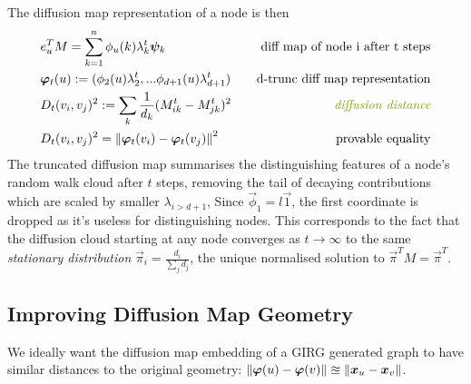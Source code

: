 The diffusion map representation of a node is then
\begin{align*}
  & e_u^T M = \sum_{k=1}^n \phi_u(k) \lambda_k^t \vec{\psi}_k \quad & \text{diff map of node i after t steps}\\
  & \vec{\varphi}_t(u) := (\phi_2(u) \lambda_2^t,... \phi_{d+1}(u) \lambda_{d+1}^t) 
  \quad & \text{d-trunc diff map representation}
  \\
  & D_t(v_i, v_j)^2 := \sum_k \frac{1}{d_k} (M^t_{ik} - M^t_{jk})^2
  \quad & \text{\textit{diffusion distance}}
  \\
  & D_t(v_i, v_j)^2 = \norm{\vec{\varphi}_t(v_i) - \vec{\varphi}_t(v_j)}^2
  \quad & \text{provable equality}
\end{align*}
%
The truncated diffusion map summarises the distinguishing features of a node's random walk cloud after $t$ steps, removing the tail of decaying contributions which are scaled by smaller $\lambda_{i > d+1}$,
Since $\vec{\phi}_1 = l \vec{1}$, the first coordinate is dropped as it's useless for distinguishing nodes. This corresponds to the fact that the diffusion cloud starting at any node converges as $t \to \infty$ to the same \textit{stationary distribution} $\vec{\pi}_i = \frac{d_i}{\sum_j d_j}$, the unique normalised solution to $\vec{\pi}^T M = \vec{\pi}^T$.

\subsection{Improving Diffusion Map Geometry}
\label{sec:diff_map_geometry}
We ideally want the diffusion map embedding of a GIRG generated graph to have similar distances to the original geometry: $\left\lVert \bm{\varphi}(u) - \bm{\varphi}(v)\right\rVert \approxeq \left\lVert \bm{x}_u - \bm{x}_v\right\rVert$.



